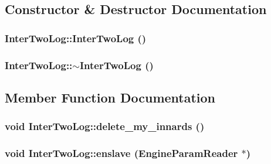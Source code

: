 \subsection{Constructor \& Destructor Documentation}
\hypertarget{classInterTwoLog_a4a7f06e802d741bac0b9934dd68b1fd3}{
\subsubsection[{InterTwoLog}]{\setlength{\rightskip}{0pt plus 5cm}InterTwoLog::InterTwoLog ()}}
\label{classInterTwoLog_a4a7f06e802d741bac0b9934dd68b1fd3}
\hypertarget{classInterTwoLog_a95e66b67f292f3bdd719fb6d57adcf1e}{
\subsubsection[{$\sim$InterTwoLog}]{\setlength{\rightskip}{0pt plus 5cm}InterTwoLog::$\sim$InterTwoLog ()}}
\label{classInterTwoLog_a95e66b67f292f3bdd719fb6d57adcf1e}


\subsection{Member Function Documentation}
\hypertarget{classInterTwoLog_a01c7c507e0f2e66d38da544cd68cb76e}{
\subsubsection[{delete\_\-my\_\-innards}]{\setlength{\rightskip}{0pt plus 5cm}void InterTwoLog::delete\_\-my\_\-innards ()}}
\label{classInterTwoLog_a01c7c507e0f2e66d38da544cd68cb76e}
\hypertarget{classInterTwoLog_aa96d91206c19b781d222f0d6e13bf51d}{
\subsubsection[{enslave}]{\setlength{\rightskip}{0pt plus 5cm}void InterTwoLog::enslave ({\bf EngineParamReader} $\ast$)}}
\label{classInterTwoLog_aa96d91206c19b781d222f0d6e13bf51d}


